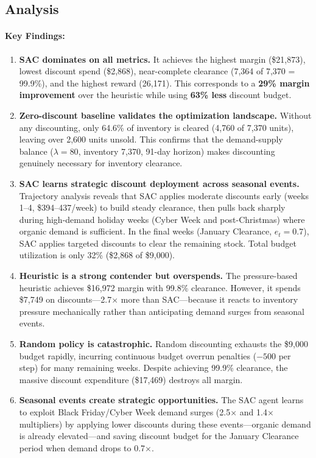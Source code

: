 \documentclass[11pt,a4paper]{article}
\begin{document}
\subsection{Analysis}

\paragraph{Key Findings:}
\begin{enumerate}
    \item \textbf{SAC dominates on all metrics.} It achieves the highest margin (\$21,873), lowest discount spend (\$2,868), near-complete clearance (7,364 of 7,370 = 99.9\%), and the highest reward (26,171). This corresponds to a \textbf{29\% margin improvement} over the heuristic while using \textbf{63\% less} discount budget.

    \item \textbf{Zero-discount baseline validates the optimization landscape.} Without any discounting, only 64.6\% of inventory is cleared (4,760 of 7,370 units), leaving over 2,600 units unsold. This confirms that the demand-supply balance ($\lambda=80$, inventory 7,370, 91-day horizon) makes discounting genuinely necessary for inventory clearance.

    \item \textbf{SAC learns strategic discount deployment across seasonal events.} Trajectory analysis reveals that SAC applies moderate discounts early (weeks 1--4, \$394--437/week) to build steady clearance, then pulls back sharply during high-demand holiday weeks (Cyber Week and post-Christmas) where organic demand is sufficient. In the final weeks (January Clearance, $e_t = 0.7$), SAC applies targeted discounts to clear the remaining stock. Total budget utilization is only 32\% (\$2,868 of \$9,000).

    \item \textbf{Heuristic is a strong contender but overspends.} The pressure-based heuristic achieves \$16,972 margin with 99.8\% clearance. However, it spends \$7,749 on discounts---2.7$\times$ more than SAC---because it reacts to inventory pressure mechanically rather than anticipating demand surges from seasonal events.

    \item \textbf{Random policy is catastrophic.} Random discounting exhausts the \$9,000 budget rapidly, incurring continuous budget overrun penalties ($-500$ per step) for many remaining weeks. Despite achieving 99.9\% clearance, the massive discount expenditure (\$17,469) destroys all margin.

    \item \textbf{Seasonal events create strategic opportunities.} The SAC agent learns to exploit Black Friday/Cyber Week demand surges (2.5$\times$ and 1.4$\times$ multipliers) by applying lower discounts during these events---organic demand is already elevated---and saving discount budget for the January Clearance period when demand drops to 0.7$\times$.
\end{enumerate}
\end{document}

